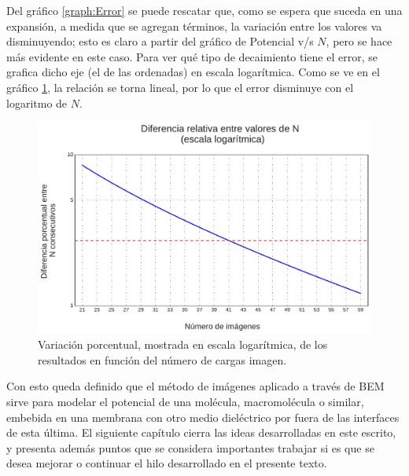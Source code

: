 \documentclass[12pt, twoside, onehalfspace, numbers, spanish]{ezthesis}
\numberwithin{equation}{section}
\begin{document}
\noindent
Del gráfico \ref{graph:Error} se puede rescatar que, como se espera que suceda en una expansión, a medida que se agregan términos, la variación entre los valores va disminuyendo; esto es claro a partir del gráfico de Potencial v/s $N$, pero se hace más evidente en este caso. Para ver qué tipo de decaimiento tiene el error, se grafica dicho eje (el de las ordenadas) en escala logarítmica. Como se ve en el gráfico \ref{graph:Error_log}, la relación se torna lineal, por lo que el error disminuye con el logaritmo de $N$.
\begin{figure}[h]
	\centering
	\includegraphics[scale = 0.5]{./Figures/Error_log}
	\caption{Variación porcentual, mostrada en escala logarítmica, de los resultados en función del número de cargas imagen.}\label{graph:Error_log}
\end{figure}
Con esto queda definido que el método de imágenes aplicado a través de BEM sirve para modelar el potencial de una molécula, macromolécula o similar, embebida en una membrana con otro medio dieléctrico por fuera de las interfaces de esta última. El siguiente capítulo cierra las ideas desarrolladas en este escrito, y presenta además puntos que se considera importantes trabajar si es que se desea mejorar o continuar el hilo desarrollado en el presente texto.
\end{document}
